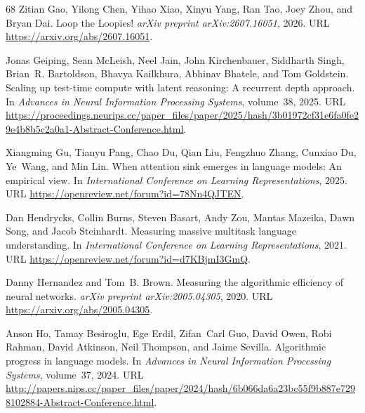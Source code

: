\documentclass[]{bytedance_seed}
\theoremstyle{definition}
\theoremstyle{remark}
\begin{document}
\begin{thebibliography}{68}
Zitian Gao, Yilong Chen, Yihao Xiao, Xinyu Yang, Ran Tao, Joey Zhou, and Bryan
  Dai.
\newblock Loop the {L}oopies!
\newblock \emph{arXiv preprint arXiv:2607.16051}, 2026.
\newblock URL \url{https://arxiv.org/abs/2607.16051}.

Jonas Geiping, Sean McLeish, Neel Jain, John Kirchenbauer, Siddharth Singh,
  Brian~R. Bartoldson, Bhavya Kailkhura, Abhinav Bhatele, and Tom Goldstein.
\newblock Scaling up test-time compute with latent reasoning: A recurrent depth
  approach.
\newblock In \emph{Advances in Neural Information Processing Systems},
  volume~38, 2025.
\newblock URL
  \url{https://proceedings.neurips.cc/paper_files/paper/2025/hash/3b01972cf31e6fa0fe29e4b8b5c2a0a1-Abstract-Conference.html}.

Xiangming Gu, Tianyu Pang, Chao Du, Qian Liu, Fengzhuo Zhang, Cunxiao Du,
  Ye~Wang, and Min Lin.
\newblock When attention sink emerges in language models: An empirical view.
\newblock In \emph{International Conference on Learning Representations}, 2025.
\newblock URL \url{https://openreview.net/forum?id=78Nn4QJTEN}.

Dan Hendrycks, Collin Burns, Steven Basart, Andy Zou, Mantas Mazeika, Dawn
  Song, and Jacob Steinhardt.
\newblock Measuring massive multitask language understanding.
\newblock In \emph{International Conference on Learning Representations}, 2021.
\newblock URL \url{https://openreview.net/forum?id=d7KBjmI3GmQ}.

Danny Hernandez and Tom~B. Brown.
\newblock Measuring the algorithmic efficiency of neural networks.
\newblock \emph{arXiv preprint arXiv:2005.04305}, 2020.
\newblock URL \url{https://arxiv.org/abs/2005.04305}.

Anson Ho, Tamay Besiroglu, Ege Erdil, Zifan~Carl Guo, David Owen, Robi Rahman,
  David Atkinson, Neil Thompson, and Jaime Sevilla.
\newblock Algorithmic progress in language models.
\newblock In \emph{Advances in Neural Information Processing Systems},
  volume~37, 2024.
\newblock URL
  \url{http://papers.nips.cc/paper_files/paper/2024/hash/6b066da6a23bc55f9b887e7298102884-Abstract-Conference.html}.


\end{thebibliography}
\end{document}
